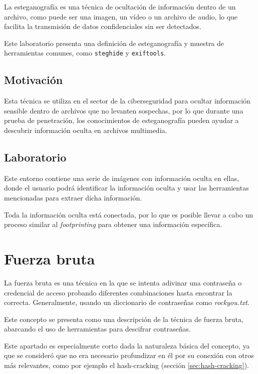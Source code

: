         La esteganografía es una técnica de ocultación de información dentro de un archivo, como puede ser una imagen, un vídeo o un archivo de audio, lo que facilita la transmisión de datos confidenciales sin ser detectados.

        Este laboratorio presenta una definición de esteganografía y muestra de herramientas comunes, como \texttt{steghide} y \texttt{exiftools}.

        \subsection{Motivación}

            Esta técnica se utiliza en el sector de la ciberseguridad para ocultar información sensible dentro de archivos que no levanten sospechas, por lo que durante una prueba de penetración, los conocimientos de esteganografía pueden ayudar a descubrir información oculta en archivos multimedia.

        \subsection{Laboratorio}

            Este entorno contiene una serie de imágenes con información oculta en ellas, donde el usuario podrá identificar la información oculta y usar las herramientas mencionadas para extraer dicha información.

            Toda la información oculta está conectada, por lo que es posible llevar a cabo un proceso similar al \textit{footprinting} para obtener una información específica.


    \section{Fuerza bruta}

        La fuerza bruta es una técnica en la que se intenta adivinar una contraseña o credencial de acceso probando diferentes combinaciones hasta encontrar la correcta. Generalmente, usando un diccionario de contraseñas como \textit{rockyou.txt}.

        Este concepto se presenta como una descripción de la técnica de fuerza bruta, abarcando el uso de herramientas para descifrar contraseñas.

        Este apartado es especialmente corto dada la naturaleza básica del concepto, ya que se consideró que no era necesario profundizar en él por su conexión con otros más relevantes, como por ejemplo el hash-cracking (sección \ref{sec:hash-cracking}).

